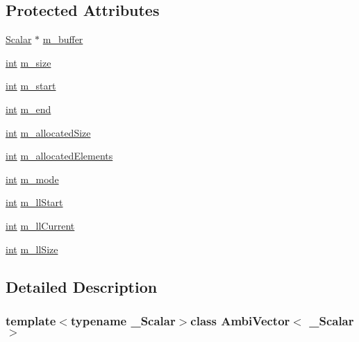 \subsection*{Protected Attributes}
\begin{DoxyCompactItemize}
\item 
\hyperlink{class_ambi_vector_a08d3ee74ff00bc66d19750bf79989e92}{Scalar} $\ast$ \hyperlink{class_ambi_vector_a2262e9c293c67b08455c7cac433949ca}{m\-\_\-buffer}
\item 
\hyperlink{ioapi_8h_a787fa3cf048117ba7123753c1e74fcd6}{int} \hyperlink{class_ambi_vector_a57b56d38a69c41a728f208a73e13c0ed}{m\-\_\-size}
\item 
\hyperlink{ioapi_8h_a787fa3cf048117ba7123753c1e74fcd6}{int} \hyperlink{class_ambi_vector_a54f46940c9a006b2c3742941df1cebc7}{m\-\_\-start}
\item 
\hyperlink{ioapi_8h_a787fa3cf048117ba7123753c1e74fcd6}{int} \hyperlink{class_ambi_vector_adb2a2a9f06dbd64a10e99e18fea3abad}{m\-\_\-end}
\item 
\hyperlink{ioapi_8h_a787fa3cf048117ba7123753c1e74fcd6}{int} \hyperlink{class_ambi_vector_a6d772745248106ddedce0894404001ee}{m\-\_\-allocated\-Size}
\item 
\hyperlink{ioapi_8h_a787fa3cf048117ba7123753c1e74fcd6}{int} \hyperlink{class_ambi_vector_aa2b08f6aeebb528610cd18484e837b81}{m\-\_\-allocated\-Elements}
\item 
\hyperlink{ioapi_8h_a787fa3cf048117ba7123753c1e74fcd6}{int} \hyperlink{class_ambi_vector_a78d7db3effaa0fcb9b71fe061d66c00d}{m\-\_\-mode}
\item 
\hyperlink{ioapi_8h_a787fa3cf048117ba7123753c1e74fcd6}{int} \hyperlink{class_ambi_vector_a86993e2686334e95b36b8e0995107bc5}{m\-\_\-ll\-Start}
\item 
\hyperlink{ioapi_8h_a787fa3cf048117ba7123753c1e74fcd6}{int} \hyperlink{class_ambi_vector_aa83e38676f9bb793b1d6ca818575d28c}{m\-\_\-ll\-Current}
\item 
\hyperlink{ioapi_8h_a787fa3cf048117ba7123753c1e74fcd6}{int} \hyperlink{class_ambi_vector_a8dd2e8783525aaff75ae08b03e1db603}{m\-\_\-ll\-Size}
\end{DoxyCompactItemize}


\subsection{Detailed Description}
\subsubsection*{template$<$typename \-\_\-\-Scalar$>$class Ambi\-Vector$<$ \-\_\-\-Scalar $>$}



